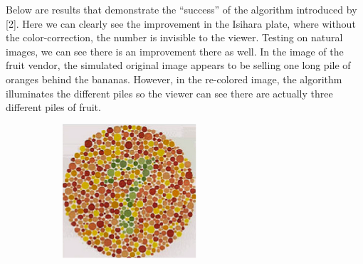 \documentclass[10pt,twocolumn,letterpaper]{article}
\begin{document}
Below are results that demonstrate the “success” of the algorithm introduced by [2]. Here we can clearly see the improvement in the Isihara plate, where without the color-correction, the number is invisible to the viewer. Testing on natural images, we can see there is an improvement there as well. In the image of the fruit vendor, the simulated original image appears to be selling one long pile of oranges behind the bananas. However, in the re-colored image, the algorithm illuminates the different piles so the viewer can see there are actually three different piles of fruit. 

\begin{figure}[h]
  \centering
  \begin{subfigure}{0.23\textwidth}
    \includegraphics[width=\textwidth]{isihara1.png}
    \caption{}
  \end{subfigure}
  \begin{subfigure}{0.23\textwidth}

\end{subfigure}
\end{figure}
\end{document}
